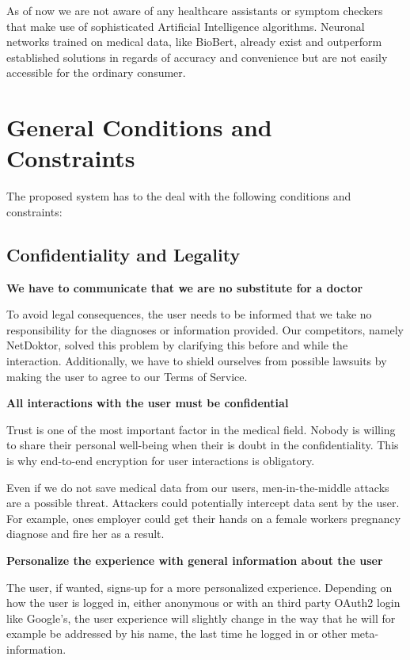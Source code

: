 \documentclass[12pt]{article}
\theoremstyle{definition}
\begin{document}
As of now we are not aware of any healthcare assistants or symptom checkers that make use of sophisticated Artificial Intelligence algorithms. Neuronal networks trained on medical data, like BioBert, already exist and outperform established solutions in regards of accuracy and convenience but are not easily accessible for the ordinary consumer.

\pagebreak


\section{General Conditions and Constraints}

{\large The proposed system has to the deal with the following conditions and constraints:}

\subsection{Confidentiality and Legality}
\vspace{2em}

{\bf We have to communicate that we are no substitute for a doctor}

To avoid legal consequences, the user needs to be informed that we take no responsibility for the diagnoses or information provided. Our competitors, namely NetDoktor, solved this problem by clarifying this before and while the interaction. Additionally, we have to shield ourselves from possible lawsuits by making the user to agree to our Terms of Service.
\vspace{2em}

{\bf All interactions with the user must be confidential}

Trust is one of the most important factor in the medical field. Nobody is willing to share their personal well-being when their is doubt in the confidentiality. This is why end-to-end encryption for user interactions is obligatory.

Even if we do not save medical data from our users, men-in-the-middle attacks are a possible threat. Attackers could potentially intercept data sent by the user. For example, ones employer could get their hands on a female workers pregnancy diagnose and fire her as a result.
\vspace{2em}

{\bf Personalize the experience with general information about the user}

The user, if wanted, signs-up for a more personalized experience. Depending on how the user is logged in, either anonymous or with an third party OAuth2 login like Google's, the user experience will slightly change in the way that he will for example be addressed by his name, the last time he logged in or other meta-information.
\vspace{2em}
\end{document}
